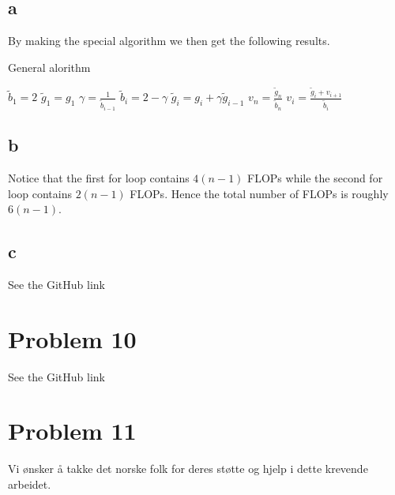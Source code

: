 \documentclass[english,notitlepage]{revtex4-1}  %
\begin{document}
    \subsection*{a}
        \label{sec:9a}
        By making the special algorithm we then get the following results. 
        \begin{algorithm}[H]
            \caption{General alorithm}\label{algo:general}
            \begin{algorithmic}
                \State $\tilde{b}_1 = 2$
                \State $\tilde{g}_1 = g_1$
                    \State $\gamma = \frac{1}{\tilde{b}_{i - 1}}$
                    \State $\tilde{b}_i = 2 - \gamma$
                    \State $\tilde{g}_i = g_i + \gamma\tilde{g}_{i-1}$
                \EndFor
                \State $v_n = \frac{\tilde{g}_n}{\tilde{b}_n}$
                    \State $v_i = \frac{\tilde{g}_i + v_{i+1}}{\tilde{b}_i}$
                \EndFor
            \end{algorithmic}
        \end{algorithm}

    \subsection*{b}
        \label{sec:9b}
        Notice that the first for loop contains $4(n-1)$ FLOPs while the second for loop contains $2(n-1)$ FLOPs.
        Hence the total number of FLOPs is roughly $6(n-1)$.

    \subsection*{c}
        \label{sec:9c}
        See the GitHub link


\section*{Problem 10}
See the GitHub link


\section*{Problem 11}
        



\begin{acknowledgements}
Vi ønsker å takke det norske folk for deres støtte og hjelp i dette krevende arbeidet. 
\end{acknowledgements}

   
\end{document}
